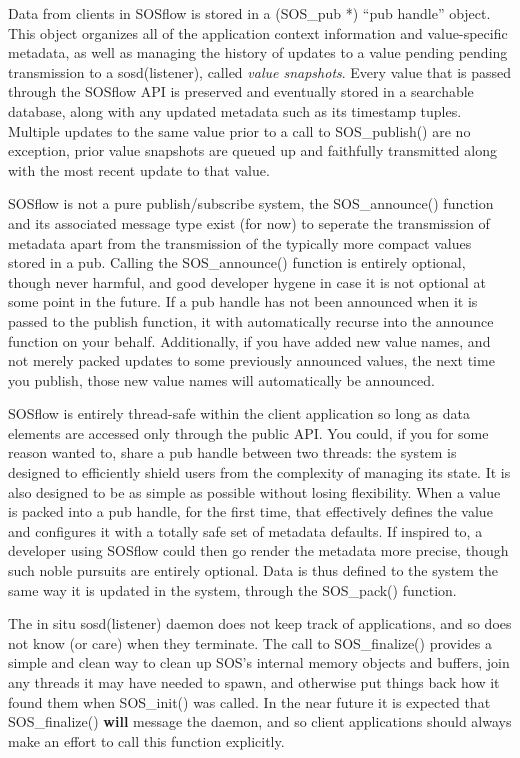 Data from clients in SOSflow is stored in a (SOS\_pub *) ``pub handle''
object. This object organizes all of the application context
information and value-specific metadata, as well as managing the
history of updates to a value pending pending transmission to a
sosd(listener), called \textit{value snapshots}. Every value that is
passed through the SOSflow API is preserved and eventually stored in a
searchable database, along with any updated metadata such as its
timestamp tuples.  Multiple updates to the same value prior to a call
to SOS\_publish() are no exception, prior value snapshots are queued
up and faithfully transmitted along with the most recent update to
that value.

SOSflow is not a pure publish/subscribe system, the SOS\_announce()
function and its associated message type exist (for now) to seperate the
transmission of metadata apart from the transmission of the typically
more compact values stored in a pub.  Calling the SOS\_announce()
function is entirely optional, though never harmful, and good
developer hygene in case it is not optional at some point in the
future. If a pub handle has not been announced when it is passed to
the publish function, it with automatically recurse into the announce
function on your behalf.  Additionally, if you have added new value
names, and not merely packed updates to some previously announced
values, the next time you publish, those new value names will
automatically be announced.

SOSflow is entirely thread-safe within the client application so long
as data elements are accessed only through the public API. You could,
if you for some reason wanted to, share a pub handle between two
threads: the system is designed to efficiently shield users from the
complexity of managing its state.  It is also designed to be as simple
as possible without losing flexibility. When a value is packed into a
pub handle, for the first time, that effectively defines the value and
configures it with a totally safe set of metadata defaults. If inspired
to, a developer using SOSflow could then go render the metadata more
precise, though such noble pursuits are entirely optional. Data is
thus defined to the system the same way it is updated in the system,
through the SOS\_pack() function.

The in situ sosd(listener) daemon does not keep track of applications,
and so does not know (or care) when they terminate. The call to SOS\_finalize()
provides a simple and clean way to clean up SOS's internal memory objects
and buffers, join any threads it may have needed to spawn, and otherwise
put things back how it found them when SOS\_init() was called. In the
near future it is expected that SOS\_finalize() \textbf{will} message the
daemon, and so client applications should always make an effort to call
this function explicitly.

